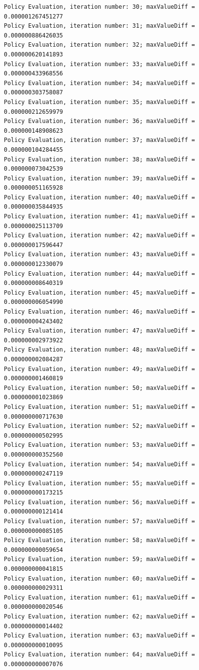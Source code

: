 \documentclass{article}
\begin{document}
\begin{scriptsize}
\begin{verbatim}
Policy Evaluation, iteration number: 30; maxValueDiff = 0.000001267451277 
Policy Evaluation, iteration number: 31; maxValueDiff = 0.000000886426035 
Policy Evaluation, iteration number: 32; maxValueDiff = 0.000000620141893 
Policy Evaluation, iteration number: 33; maxValueDiff = 0.000000433968556 
Policy Evaluation, iteration number: 34; maxValueDiff = 0.000000303758087 
Policy Evaluation, iteration number: 35; maxValueDiff = 0.000000212659979 
Policy Evaluation, iteration number: 36; maxValueDiff = 0.000000148908623 
Policy Evaluation, iteration number: 37; maxValueDiff = 0.000000104284455 
Policy Evaluation, iteration number: 38; maxValueDiff = 0.000000073042539 
Policy Evaluation, iteration number: 39; maxValueDiff = 0.000000051165928 
Policy Evaluation, iteration number: 40; maxValueDiff = 0.000000035844935 
Policy Evaluation, iteration number: 41; maxValueDiff = 0.000000025113709 
Policy Evaluation, iteration number: 42; maxValueDiff = 0.000000017596447 
Policy Evaluation, iteration number: 43; maxValueDiff = 0.000000012330079 
Policy Evaluation, iteration number: 44; maxValueDiff = 0.000000008640319 
Policy Evaluation, iteration number: 45; maxValueDiff = 0.000000006054990 
Policy Evaluation, iteration number: 46; maxValueDiff = 0.000000004243402 
Policy Evaluation, iteration number: 47; maxValueDiff = 0.000000002973922 
Policy Evaluation, iteration number: 48; maxValueDiff = 0.000000002084287 
Policy Evaluation, iteration number: 49; maxValueDiff = 0.000000001460819 
Policy Evaluation, iteration number: 50; maxValueDiff = 0.000000001023869 
Policy Evaluation, iteration number: 51; maxValueDiff = 0.000000000717630 
Policy Evaluation, iteration number: 52; maxValueDiff = 0.000000000502995 
Policy Evaluation, iteration number: 53; maxValueDiff = 0.000000000352560 
Policy Evaluation, iteration number: 54; maxValueDiff = 0.000000000247119 
Policy Evaluation, iteration number: 55; maxValueDiff = 0.000000000173215 
Policy Evaluation, iteration number: 56; maxValueDiff = 0.000000000121414 
Policy Evaluation, iteration number: 57; maxValueDiff = 0.000000000085105 
Policy Evaluation, iteration number: 58; maxValueDiff = 0.000000000059654 
Policy Evaluation, iteration number: 59; maxValueDiff = 0.000000000041815 
Policy Evaluation, iteration number: 60; maxValueDiff = 0.000000000029311 
Policy Evaluation, iteration number: 61; maxValueDiff = 0.000000000020546 
Policy Evaluation, iteration number: 62; maxValueDiff = 0.000000000014402 
Policy Evaluation, iteration number: 63; maxValueDiff = 0.000000000010095 
Policy Evaluation, iteration number: 64; maxValueDiff = 0.000000000007076 

\end{verbatim}
\end{scriptsize}
\end{document}
